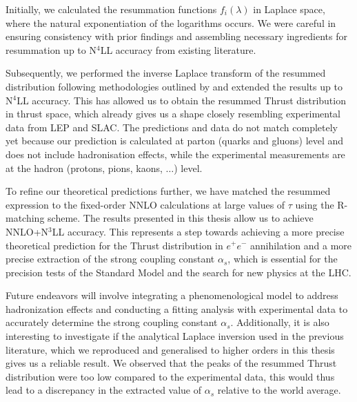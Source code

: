 \documentclass[../Tesi_Jiahao_Miao_986136.tex]{subfiles}
\begin{document}
Initially, we calculated the resummation functions $f_i(\lambda)$ in Laplace space, where the natural exponentiation of the logarithms occurs.
We were careful in ensuring consistency with prior findings and assembling necessary ingredients for resummation up to N$^4$LL accuracy from existing literature.

Subsequently, we performed the inverse Laplace transform of the resummed distribution following methodologies outlined by \cite{CATANI19933} and extended the results up to N$^4$LL accuracy.
This has allowed us to obtain the resummed Thrust distribution in thrust space, which already gives us a shape 
closely resembling experimental data from LEP and SLAC. The predictions and data do not match completely yet because our prediction is calculated at parton (quarks and gluons) level and does not include hadronisation effects, while
the experimental measurements are at the hadron (protons, pions, kaons, $\ldots$) level. 

To refine our theoretical predictions further, we have matched the resummed expression to the fixed-order NNLO calculations at large values of $\tau$ using the R-matching scheme.
The results presented in this thesis allow us to achieve NNLO+N$^3$LL accuracy.
This represents a step towards achieving a more precise theoretical prediction for the Thrust distribution in $e^+e^-$ annihilation and
a more precise extraction of the strong coupling constant $\alpha_s$, which is essential for the precision tests of the Standard Model and the search for new physics at the LHC.

Future endeavors will involve integrating a phenomenological model to address hadronization effects and conducting a fitting analysis with experimental data 
to accurately determine the strong coupling constant $\alpha_s$. Additionally, it is also interesting 
to investigate if the analytical Laplace inversion used in the previous literature, which we reproduced and generalised to higher orders in this thesis
gives us a reliable result. We observed that the peaks of the resummed Thrust distribution were too low compared to the experimental data, this would thus
lead to a discrepancy in the extracted value of $\alpha_s$ relative to the world average.
\end{document}
